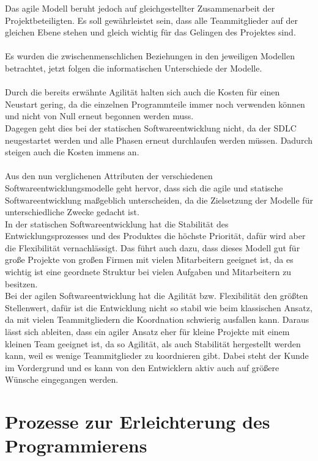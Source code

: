 \documentclass[a4paper, 10pt]{scrartcl}
\begin{document}
Das agile Modell beruht jedoch auf gleichgestellter Zusammenarbeit der Projektbeteiligten. Es soll gewährleistet sein, dass alle Teammitglieder auf der gleichen Ebene stehen und gleich wichtig für das Gelingen des Projektes sind.\\\\
Es wurden die zwischenmenschlichen Beziehungen in den jeweiligen Modellen betrachtet, jetzt folgen die informatischen Unterschiede der Modelle.\\\\
Durch die bereits erwähnte Agilität halten sich auch die Kosten für einen Neustart gering, da die einzelnen Programmteile immer noch verwenden können und nicht \glqq von Null\grqq{} erneut begonnen werden muss.\\
Dagegen geht dies bei der statischen Softwareentwicklung nicht, da der SDLC neugestartet werden und alle Phasen erneut durchlaufen werden müssen. Dadurch steigen auch die Kosten immens an.\\\\
Aus den nun verglichenen Attributen der verschiedenen Softwareentwicklungsmodelle geht hervor, dass sich die agile und statische Softwareentwicklung maßgeblich unterscheiden, da die Zielsetzung der Modelle für unterschiedliche Zwecke gedacht ist.\\
In der statischen Softwareentwicklung hat die Stabilität des Entwicklungsprozesses und des Produktes die höchste Priorität, dafür wird aber die Flexibilität vernachlässigt. Das führt auch dazu, dass dieses Modell gut für große Projekte von großen Firmen mit vielen Mitarbeitern geeignet ist, da es wichtig ist eine geordnete Struktur bei vielen Aufgaben und Mitarbeitern zu besitzen.\\
Bei der agilen Softwareentwicklung hat die Agilität bzw. Flexibilität den größten Stellenwert, dafür ist die Entwicklung nicht so stabil wie beim klassischen Ansatz, da mit vielen Teammitgliedern die Koordnation schwierig ausfallen kann. Daraus lässt sich ableiten, dass ein agiler Ansatz eher für kleine Projekte mit einem kleinen Team geeignet ist, da so Agilität, als auch Stabilität hergestellt werden kann, weil es wenige Teammitglieder zu koordnieren gibt. Dabei steht der Kunde im Vordergrund und es kann von den Entwicklern aktiv auch auf größere Wünsche eingegangen werden.

\section{Prozesse zur Erleichterung des Programmierens}
\end{document}

